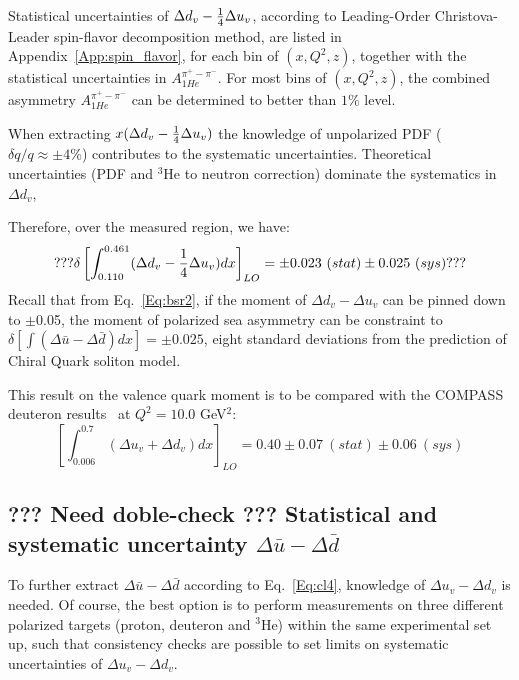 Statistical uncertainties of $\Delta d_v-{1 \over 4} \Delta u_v$, according to Leading-Order Christova-Leader spin-flavor decomposition method, are listed in Appendix~\ref{App:spin_flavor}, for each bin of $(x, Q^2, z)$, together with the statistical uncertainties in $A_{1He}^{\pi^+ - \pi^-}$. For most bins of $(x, Q^2, z)$, the combined asymmetry $A_{1He}^{\pi^+ - \pi^-}$ can be determined to better than $1\%$ level.


When extracting $x( \Delta d_v -{1 \over 4} \Delta u_v )$ 
the knowledge of unpolarized PDF ($\delta q/q \approx \pm 4\%$)  contributes 
to the systematic uncertainties. Theoretical uncertainties 
(PDF and $^3$He to neutron correction) dominate the systematics in $\Delta d_v$, %

Therefore, over the measured region, we have:
\begin{equation}
 ??? \delta \left[\int_{0.110}^{0.461}(\Delta d_v -{1 \over 4} \Delta u_v)dx \right]_{LO} = \pm 0.023 ~(stat) \pm 0.025~(sys) ???
\end{equation}
Recall that from Eq.~\ref{Eq:bsr2}, if the moment of $\Delta d_v- \Delta u_v$ can be pinned down to $\pm$0.05, 
the moment of polarized sea asymmetry can be constraint to $\delta \left[\int(\Delta \bar{u} - \Delta \bar{d})dx \right] = \pm 0.025$, eight
standard deviations from the prediction of Chiral Quark soliton model.
 
 This result on the valence quark moment is to be compared with the COMPASS deuteron results~\cite{compass2007} at $Q^2=10.0$ GeV$^2$:
\begin{equation}
  \left[\int_{0.006}^{0.7}(\Delta u_v + \Delta d_v)dx \right]_{LO} =  0.40 \pm 0.07 ~(stat) \pm 0.06~(sys) 
\end{equation}


\subsection{??? Need doble-check ??? Statistical and systematic uncertainty $\Delta \bar{u} -\Delta \bar{d}$}
To further extract $\Delta \bar{u}-\Delta \bar{d}$ according to Eq.~\ref{Eq:cl4}, 
knowledge of $\Delta u_v - \Delta d_v$ is needed.  
Of course, the best option is to perform measurements on three different polarized 
targets (proton, deuteron and $^3$He) within the same experimental set up, such that
consistency checks are possible to set limits on systematic uncertainties of $\Delta u_v - \Delta d_v$.

